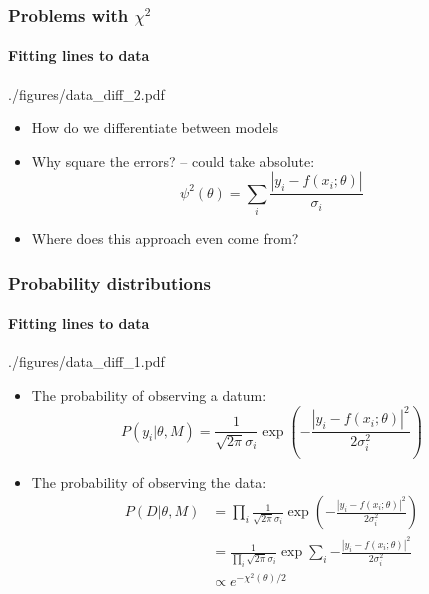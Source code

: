 \documentclass[%
]{beamer}
\begin{document}
\begin{frame}
    \frametitle{Problems with $\chi^2$}
    \framesubtitle{Fitting lines to data}
    \begin{figright}[0.4]{./figures/data_diff_2.pdf}
        \begin{itemize}
            \item How do we differentiate between models
            \item Why square the errors? -- could take absolute:
                \[
                    \psi^2(\theta) = \sum_i \frac{\left|y_i - f(x_i;\theta)\right|}{\sigma_i}
                \]
            \item Where does this approach even come from?
        \end{itemize}
    \end{figright}
\end{frame}


\begin{frame}
    \frametitle{Probability distributions}
    \framesubtitle{Fitting lines to data}
    \begin{figright}[0.6]{./figures/data_diff_1.pdf}
        \begin{itemize}
            \item The probability of observing a datum:
                \[
                    P(y_i | \theta,M) = \frac{1}{\sqrt{2\pi}\sigma_i}\exp\left({-\frac{|y_i-f(x_i;\theta)|^2}{2\sigma_i^2}}\right)
                \]
            \item The probability of observing the data:
                \begin{align}
                    P(D | \theta,M) &= \prod_i \frac{1}{\sqrt{2\pi}\sigma_i}\exp\left({-\frac{|y_i-f(x_i;\theta)|^2}{2\sigma_i^2}}\right) \nonumber\\
                    &=  \frac{1}{\prod_i\sqrt{2\pi}\sigma_i}\exp\sum_i{-\frac{|y_i-f(x_i;\theta)|^2}{2\sigma_i^2}} \nonumber\\
                    &\propto e^{-\chi^2(\theta)/2}
                    \nonumber
                \end{align}
        \end{itemize}
    \end{figright}
\end{frame}
\end{document}
